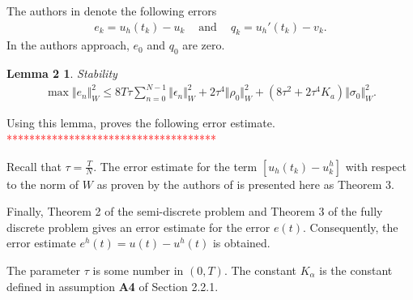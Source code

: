 \documentclass[../../main.tex]{subfiles}
\begin{document}
The authors in \cite{BV13} denote the following errors
\begin{eqnarray*}
	e_{k}=u_{h}(t_{k})-u_{k} \ \ \ \ \textrm{ and } \ \ \ \ q_{k}=u_{h}'(t_{k})-v_{k}.
\end{eqnarray*} In the authors approach, $e_0$ and $q_0$ are zero.

\newtheorem*{DC_Lem3}{Lemma 2}
\begin{DC_Lem3}
	Stability
	\begin{eqnarray*}
		\max\Vert e_{n}\Vert_{W}^{2}\leq 8T\tau\sum_{n=0}^{N-1}\Vert\epsilon_{n}\Vert_{W}^{2}+2\tau^{4}\Vert\rho_{0}\Vert_{W}^{2}+(8\tau^{2}+2\tau^{4}K_{a})\Vert\sigma_{0}\Vert_{W}^{2}.
	\end{eqnarray*}
\end{DC_Lem3}

Using this lemma, \cite{BV13} proves the following error estimate.\\
\textcolor{red}{*************************************}

Recall that $\displaystyle \tau = \frac{T}{N}$. The error estimate for the term
$[u_h(t_k) - u^h_k]$ with respect to the norm of $W$ as proven by the authors
of \cite{BV13} is presented here as Theorem 3.

Finally, Theorem 2 of the semi-discrete problem and Theorem 3 of the fully
discrete problem gives an error estimate for the error $e(t)$. Consequently,
the error estimate $e^h(t) = u(t) - u^h(t)$ is obtained.



The parameter $\tau$ is some number in $(0,T)$. The constant $K_\alpha$ is the constant defined in assumption \textbf{A4} of Section 2.2.1.
\end{document}
